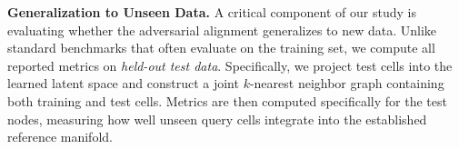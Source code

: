 \documentclass[unnumsec,webpdf,contemporary,large]{oup-authoring-template}%
\theoremstyle{thmstyleone}%
\theoremstyle{thmstyletwo}%
\theoremstyle{thmstylethree}%
\begin{document}
\textbf{Generalization to Unseen Data.} A critical component of our study is evaluating whether the adversarial alignment generalizes to new data. Unlike standard benchmarks that often evaluate on the training set, we compute all reported metrics on \textit{held-out test data}. Specifically, we project test cells into the learned latent space and construct a joint $k$-nearest neighbor graph containing both training and test cells. Metrics are then computed specifically for the test nodes, measuring how well unseen query cells integrate into the established reference manifold.



\end{document}
